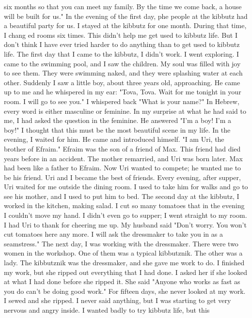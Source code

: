 six months so that you can meet my family. By the time we come back, 
a house will be built for us." In the evening of the first day, phe 
people at the kibbutz had a beautiful party for us. 
I stayed at the kibbutz for one month. During that time, I chang 
ed rooms six times. This didn't help me get used to kibbutz life. But 
I don't think I have ever tried harder to do anything than to get used 
to kibbutz life. 
The first day that I came to the kibbutz, I didn't work. I 
went exploring. I came to the swimming pool, and I saw the children. 
My soul was filled with joy to see them. They were swimming naked, 
and they were splashing water at each other. Suddenly I saw a little 
boy, about three years old, approaching. He came up to me and he whispered in my ear: "Tova, Tova. Wait for me tonight in your room. I 
will go to see you." I whispered back "What is your name?" In Hebrew, every word is either masculine or feminine. In my surprise at 
what he had said to me, I had asked the question in the feminine. He 
answered "I'm a boy! I'm a boy!" I thought that this must be the most 
beautiful scene in my life. 
In the evening, I waited for him. He came and introduced himself. 
"I am Uri, the brother of Efraim." Efraim was the son of a friend of 
Max. This friend had died years before in an accident. The mother remarried, and Uri was born later. Max had been like a father to Efraim. 
Now Uri wanted to compete; he wanted me to be his friend. Uri and I 
became the best of friends. Every evening, after supper, Uri waited for 
me outside the dining room. I used to take him for walks and go to see 
his mother, and I used to put him to bed. 
The second day at the kibbutz, I worked in the kitchen, making 
salad. I cut so many tomatoes that in the evening I couldn't move my 
hand. I didn't even go to supper; I went straight to my room. I had 
Uri to thank for cheering me up. My husband said "Don't worry. You 
won't cut tomatoes here any more. I will ask the dressmaker to take you 
in as a seamstress." 
The next day, I was working with the dressmaker. There were two 
women in the workshop. One of them was a typical kibbutznik. The other 
was a lady. The kibbutznik was the dressmaker, and she gave me work 
to do. I finished my work, but she ripped out everything that I had 
done. I asked her if she looked at what I had done before she ripped 
it. She said "Anyone who works as fast as you do can't be doing good 
work." For fifteen days, she never looked at my work. I sewed and she 
ripped. I never said anything, but I was starting to get very nervous 
and angry inside. I wanted badly to try kibbutz life, but this
